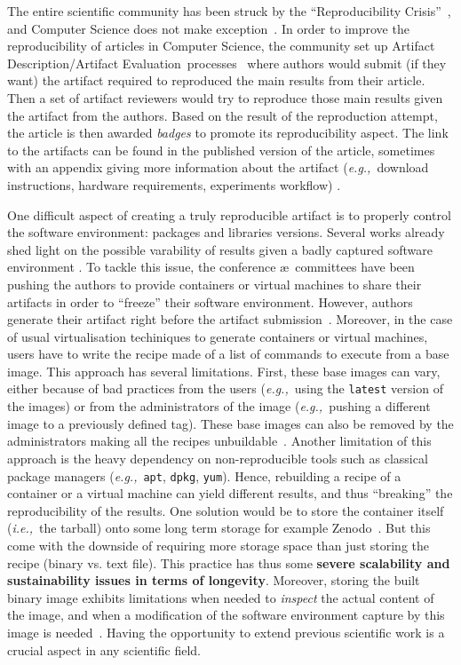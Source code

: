 \documentclass[sigconf,natbib=false]{acmart}
\newcommand{\ie}{\emph{i.e.,}}
\newcommand{\eg}{\emph{e.g.,}}
\newcommand{\ad}{Artifact Description}
\newcommand{\aeval}{Artifact Evaluation}
\newcommand{\adae}{\ad/\aeval}
\newcommand{\todo}[1]{{\color{red}{TODO: #1}}}
\begin{document}
The entire scientific community has been struck by the ``Reproducibility Crisis''~\cite{baker500ScientistsLift2016}, and Computer Science does not make exception~\cite{collberg_repeatability_2015}.
In order to improve the reproducibility of articles in Computer Science, the community set up \adae\ processes~\cite{kidwell2016badges} where authors would submit (if they want) the artifact required to reproduced the main results from their article.
Then a set of artifact reviewers would try to reproduce those main results given the artifact from the authors.
Based on the result of the reproduction attempt, the article is then awarded \emph{badges} to promote its reproducibility aspect.
The link to the artifacts can be found in the published version of the article, sometimes with an appendix giving more information about the artifact (\eg\ download instructions, hardware requirements, experiments workflow) \cite{paperswithcode, kang2023papers, hong2013software}.

One difficult aspect of creating a truly reproducible artifact is to properly control the software environment: packages and libraries versions.
Several works already shed light on the possible varability of results given a badly captured software environment \cite{mytkowicz_producing_nodate} \todo{more}.
To tackle this issue, the conference \ae\ committees have been pushing the authors to provide containers or virtual machines to share their artifacts in order to ``freeze'' their software environment.
However, authors generate their artifact right before the artifact submission~\cite{guilloteau2024longevity, guilloteau2024frustrations}.
Moreover, in the case of usual virtualisation techiniques to generate containers or virtual machines, users have to write the recipe made of a list of commands to execute from a base image.
This approach has several limitations.
First, these base images can vary, either because of bad practices from the users (\eg\ using the \texttt{latest} version of the images) or from the administrators of the image (\eg\ pushing a different image to a previously defined tag).
These base images can also be removed by the administrators making all the recipes unbuildable~\cite{nvidia_cuda_lifetime}.
Another limitation of this approach is the heavy dependency on non-reproducible tools such as classical package managers (\eg\ \texttt{apt}, \texttt{dpkg}, \texttt{yum}).
Hence, rebuilding a recipe of a container or a virtual machine can yield different results, and thus ``breaking'' the reproducibility of the results.
One solution would be to store the container itself (\ie\ the tarball) onto some long term storage for example Zenodo~\cite{zenodo}.
But this come with the downside of requiring more storage space than just storing the recipe (binary vs. text file).
This practice has thus some \textbf{severe scalability and sustainability issues in terms of longevity}.
Moreover, storing the built binary image exhibits limitations when needed to \emph{inspect} the actual content of the image, and when a modification of the software environment capture by this image is needed~\cite{mercier2018considering}.
Having the opportunity to extend previous scientific work is a crucial aspect in any scientific field.
\end{document}
